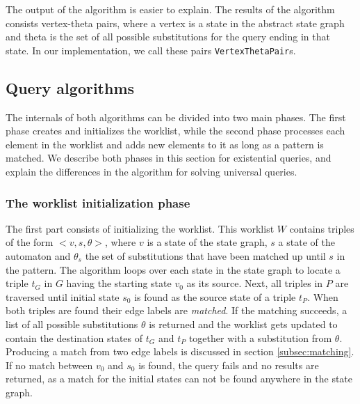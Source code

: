 The output of the algorithm is easier to explain. The results of the algorithm consists vertex-theta pairs, where a vertex is a state in the abstract state graph and theta is the set of all possible substitutions for the query ending in that state. In our implementation, we call these pairs \texttt{VertexThetaPair}s.

\subsection{Query algorithms}
\label{subsec:algorithms}

The internals of both algorithms can be divided into two main phases. The first phase creates and initializes the worklist, while the second phase processes each element in the worklist and adds new elements to it as long as a pattern is matched. We describe both phases in this section for existential queries, and explain the differences in the algorithm for solving universal queries.


\subsubsection*{The worklist initialization phase}
 The first part consists of initializing the worklist. This worklist $W$ contains triples of the form $<v, s, \theta>$, where $v$ is a state of the state graph, $s$ a state of the automaton and $\theta_s$ the set of substitutions that have been matched up until $s$ in the pattern. The algorithm loops over each state in the state graph to locate a triple $t_G$ in $G$ having the starting state $v_0$ as its source. Next, all triples in $P$ are traversed until initial state $s_0$ is found as the source state of a triple $t_P$. When both triples are found their edge labels are \textit{matched}. If the matching succeeds, a list of all possible substitutions $\theta$ is returned and the worklist gets updated to contain the destination states of $t_G$ and $t_P$ together with a substitution from $\theta$. Producing a match from two edge labels is discussed in section \ref{subsec:matching}. If no match between $v_0$ and $s_0$ is found, the query fails and no results are returned, as a match for the initial states can not be found anywhere in the state graph.

